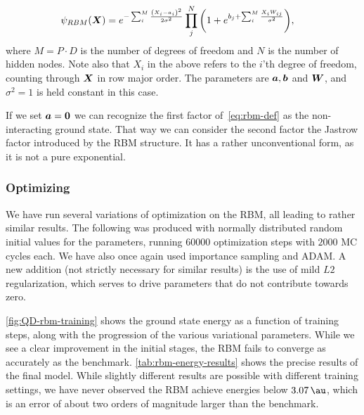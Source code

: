\documentclass[Thesis.tex]{subfiles}
\begin{document}
\begin{align}
  \label{eq:rbm-def}
  \psi_{RBM}(\bm{X}) &=
        e^{-\sum_i^{M} \frac{\qty(X_i-a_i)^2}{2\sigma^2}}
        \prod_j^N \qty(1 + e^{b_j+\sum_i^M \frac{X_iW_{ij}}{\sigma^2}}),
\end{align}
where $M = P\cdot D$ is the number of degrees of freedom and $N$ is the number
of hidden nodes. Note also that $X_i$ in the above refers to the $i$'th degree
of freedom, counting through $\bm{X}$ in row major order. The parameters are
$\bm{a}, \bm{b}$ and $\bm{W}$, and $\sigma^2=1$ is held constant in this case.

If we set $\bm{a} = \bm{0}$ we can recognize the first factor of~\cref{eq:rbm-def}
as the non-interacting ground state. That way we can consider the second factor
the Jastrow factor introduced by the RBM structure. It has a rather
unconventional form, as it is not a pure exponential.


\subsubsection{Optimizing}

We have run several variations of optimization on the RBM, all leading to rather
similar results. The following was produced with normally distributed random
initial values for the parameters, running $\num{60000}$ optimization steps with
$\num{2000}$ MC cycles each. We have also once again used importance sampling
and ADAM. A new addition (not strictly necessary for similar results) is the use
of mild $L2$ regularization, which serves to drive parameters that do not
contribute towards zero.

\cref{fig:QD-rbm-training} shows the ground state energy as a function of
training steps, along with the progression of the various variational
parameters. While we see a clear improvement in the initial stages, the RBM
fails to converge as accurately as the benchmark. \cref{tab:rbm-energy-results}
shows the precise results of the final model. While slightly different results
are possible with different training settings, we have never observed the RBM
achieve energies below $\SI{3.07}{\au}$, which is an error of about two orders
of magnitude larger than the benchmark.



%         
\end{document}

